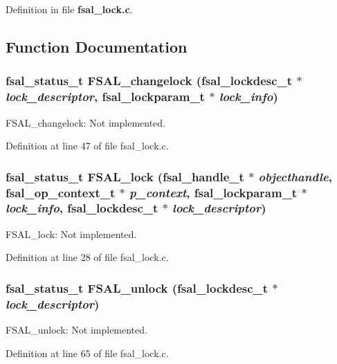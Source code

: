 Definition in file {\bf fsal\_\-lock.c}.

\subsection{Function Documentation}
\subsubsection{\setlength{\rightskip}{0pt plus 5cm}fsal\_\-status\_\-t FSAL\_\-changelock (fsal\_\-lockdesc\_\-t $\ast$ {\em lock\_\-descriptor}, fsal\_\-lockparam\_\-t $\ast$ {\em lock\_\-info})}\label{fsal__lock_8c_a1}


FSAL\_\-changelock: Not implemented. 

Definition at line 47 of file fsal\_\-lock.c.
\subsubsection{\setlength{\rightskip}{0pt plus 5cm}fsal\_\-status\_\-t FSAL\_\-lock (fsal\_\-handle\_\-t $\ast$ {\em objecthandle}, fsal\_\-op\_\-context\_\-t $\ast$ {\em p\_\-context}, fsal\_\-lockparam\_\-t $\ast$ {\em lock\_\-info}, fsal\_\-lockdesc\_\-t $\ast$ {\em lock\_\-descriptor})}\label{fsal__lock_8c_a0}


FSAL\_\-lock: Not implemented. 

Definition at line 28 of file fsal\_\-lock.c.
\subsubsection{\setlength{\rightskip}{0pt plus 5cm}fsal\_\-status\_\-t FSAL\_\-unlock (fsal\_\-lockdesc\_\-t $\ast$ {\em lock\_\-descriptor})}\label{fsal__lock_8c_a2}


FSAL\_\-unlock: Not implemented. 

Definition at line 65 of file fsal\_\-lock.c.